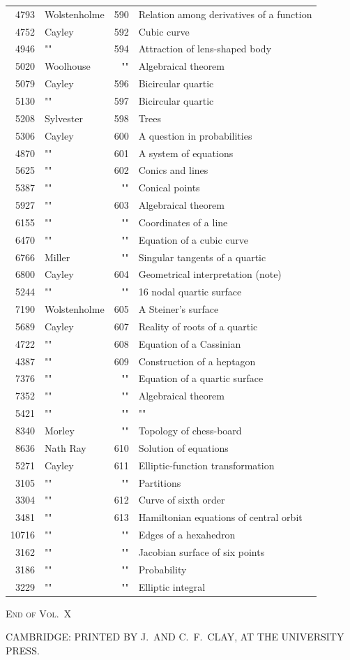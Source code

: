 \documentclass[11pt,a4paper]{article}
\theoremstyle{definition}
\newcommand{\ditto}{""}
\begin{document}
\begin{center}
\begin{tabular}{r@{\quad}l@{\quad}r@{\quad}l}
4793 & Wolstenholme & 590 & Relation among derivatives of a function \\
4752 & Cayley & 592 & Cubic curve \\
4946 & \ditto & 594 & Attraction of lens-shaped body \\
5020 & Woolhouse & \ditto & Algebraical theorem \\
5079 & Cayley & 596 & Bicircular quartic \\
5130 & \ditto & 597 & Bicircular quartic \\
5208 & Sylvester & 598 & Trees \\
5306 & Cayley & 600 & A question in probabilities \\
4870 & \ditto & 601 & A system of equations \\
5625 & \ditto & 602 & Conics and lines \\
5387 & \ditto & \ditto & Conical points \\
5927 & \ditto & 603 & Algebraical theorem \\
6155 & \ditto & \ditto & Coordinates of a line \\
6470 & \ditto & \ditto & Equation of a cubic curve \\
6766 & Miller & \ditto & Singular tangents of a quartic \\
6800 & Cayley & 604 & Geometrical interpretation (note) \\
5244 & \ditto & \ditto & 16 nodal quartic surface \\
7190 & Wolstenholme & 605 & A Steiner's surface \\
5689 & Cayley & 607 & Reality of roots of a quartic \\
4722 & \ditto & 608 & Equation of a Cassinian \\
4387 & \ditto & 609 & Construction of a heptagon \\
7376 & \ditto & \ditto & Equation of a quartic surface \\
7352 & \ditto & \ditto & Algebraical theorem \\
5421 & \ditto & \ditto & \ditto \\
8340 & Morley & \ditto & Topology of chess-board \\
8636 & Nath Ray & 610 & Solution of equations \\
5271 & Cayley & 611 & Elliptic-function transformation \\
3105 & \ditto & \ditto & Partitions \\
3304 & \ditto & 612 & Curve of sixth order \\
3481 & \ditto & 613 & Hamiltonian equations of central orbit \\
10716 & \ditto & \ditto & Edges of a hexahedron \\
3162 & \ditto & \ditto & Jacobian surface of six points \\
3186 & \ditto & \ditto & Probability \\
3229 & \ditto & \ditto & Elliptic integral
\end{tabular}
\end{center}

\vfill

\begin{center}
\textsc{End of Vol.~X}

\medskip

CAMBRIDGE: PRINTED BY J.~AND C.~F.~CLAY, AT THE UNIVERSITY PRESS.
\end{center}
\end{document}
